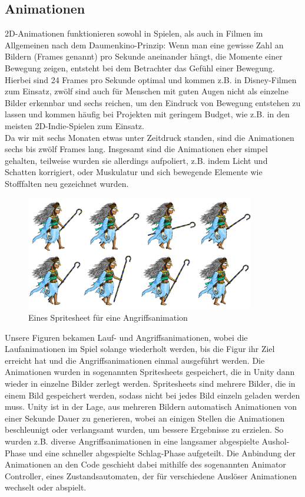 \documentclass[extern,palatino]{cgBA}
\begin{document}
\subsection{Animationen}
2D-Animationen funktionieren sowohl in Spielen, als auch in Filmen im Allgemeinen nach dem Daumenkino-Prinzip: Wenn man eine gewisse Zahl an Bildern (Frames genannt) pro Sekunde aneinander hängt, die Momente einer Bewegung zeigen, entsteht bei dem Betrachter das Gefühl einer Bewegung. Hierbei sind 24 Frames pro Sekunde optimal und kommen z.B. in Disney-Filmen zum Einsatz, zwölf sind auch für Menschen mit guten Augen nicht als einzelne Bilder erkennbar und sechs reichen, um den Eindruck von Bewegung entstehen zu lassen und kommen häufig bei Projekten mit geringem Budget, wie z.B. in den meisten 2D-Indie-Spielen zum Einsatz. 
\\Da wir mit sechs Monaten etwas unter Zeitdruck standen, sind die Animationen sechs bis zwölf Frames lang. Insgesamt sind die Animationen eher simpel gehalten, teilweise wurden sie allerdings aufpoliert, z.B. indem Licht und Schatten korrigiert, oder Muskulatur und sich bewegende Elemente wie Stofffalten neu gezeichnet wurden.
\begin{figure}[H]
	\centering
	\includegraphics[height=5cm]{move1.jpg}
	\caption{Eines Spritesheet für eine Angriffsanimation}
\end{figure}
Unsere Figuren bekamen Lauf- und Angriffsanimationen, wobei die Laufanimationen im Spiel solange wiederholt werden, bis die Figur ihr Ziel erreicht hat und die Angriffsanimationen einmal ausgeführt werden. Die Animationen wurden in sogenannten Spritesheets gespeichert, die in Unity dann wieder in einzelne Bilder zerlegt werden. Spritesheets sind mehrere Bilder, die in einem Bild gespeichert werden, sodass nicht bei jedes Bild einzeln geladen werden muss. Unity ist in der Lage, aus mehreren Bildern automatisch Animationen von einer Sekunde Dauer zu generieren, wobei an einigen Stellen die Animationen beschleunigt oder verlangsamt wurden, um bessere Ergebnisse zu erzielen. So wurden z.B. diverse Angriffsanimationen in eine langsamer abgespielte Aushol-Phase und eine schneller abgespielte Schlag-Phase aufgeteilt. Die Anbindung der Animationen an den Code geschieht dabei mithilfe des sogenannten Animator Controller, eines Zustandsautomaten, der für verschiedene Auslöser Animationen wechselt oder abspielt.
\end{document}
